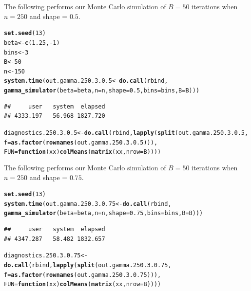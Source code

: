 \documentclass[11pt]{article}\usepackage[]{graphicx}\usepackage[]{color}
\makeatletter
\newcommand{\hlnum}[1]{\textcolor[rgb]{0.686,0.059,0.569}{#1}}%
\newcommand{\hlopt}[1]{\textcolor[rgb]{0,0,0}{#1}}%
\newcommand{\hlstd}[1]{\textcolor[rgb]{0.345,0.345,0.345}{#1}}%
\newcommand{\hlkwa}[1]{\textcolor[rgb]{0.161,0.373,0.58}{\textbf{#1}}}%
\newcommand{\hlkwb}[1]{\textcolor[rgb]{0.69,0.353,0.396}{#1}}%
\newcommand{\hlkwc}[1]{\textcolor[rgb]{0.333,0.667,0.333}{#1}}%
\newcommand{\hlkwd}[1]{\textcolor[rgb]{0.737,0.353,0.396}{\textbf{#1}}}%
\newenvironment{kframe}{%
 \def\at@end@of@kframe{}%
 \ifinner\ifhmode%
  \def\at@end@of@kframe{\end{minipage}}%
  \begin{minipage}{\columnwidth}%
 \fi\fi%
 \def\FrameCommand##1{\hskip\@totalleftmargin \hskip-\fboxsep
 \colorbox{shadecolor}{##1}\hskip-\fboxsep
     \hskip-\linewidth \hskip-\@totalleftmargin \hskip\columnwidth}%
 \MakeFramed {\advance\hsize-\width
   \@totalleftmargin\z@ \linewidth\hsize
   \@setminipage}}%
 {\par\unskip\endMakeFramed%
 \at@end@of@kframe}
\newenvironment{knitrout}{}{} %
\makeatother
\begin{document}
The following performs our Monte Carlo simulation of $B = 50$ iterations 
when $n = 250$ and shape = $0.5$.

\begin{knitrout}
\color{fgcolor}\begin{kframe}
\begin{alltt}
\hlkwd{set.seed}\hlstd{(}\hlnum{13}\hlstd{)}
\hlstd{beta} \hlkwb{<-} \hlkwd{c}\hlstd{(}\hlnum{1.25}\hlstd{,} \hlopt{-}\hlnum{1}\hlstd{)}
\hlstd{bins} \hlkwb{<-} \hlnum{3}
\hlstd{B} \hlkwb{<-} \hlnum{50}
\hlstd{n} \hlkwb{<-} \hlnum{150}
\hlkwd{system.time}\hlstd{(out.gamma.250.3.0.5} \hlkwb{<-} \hlkwd{do.call}\hlstd{(rbind,}
  \hlkwd{gamma_simulator}\hlstd{(}\hlkwc{beta} \hlstd{= beta,} \hlkwc{n} \hlstd{= n,} \hlkwc{shape} \hlstd{=} \hlnum{0.5}\hlstd{,} \hlkwc{bins} \hlstd{= bins,} \hlkwc{B} \hlstd{= B)))}
\end{alltt}
\begin{verbatim}
##     user   system  elapsed 
## 4333.197   56.968 1827.720
\end{verbatim}
\begin{alltt}
\hlstd{diagnostics.250.3.0.5} \hlkwb{<-} \hlkwd{do.call}\hlstd{(rbind,} \hlkwd{lapply}\hlstd{(}\hlkwd{split}\hlstd{(out.gamma.250.3.0.5,}
  \hlkwc{f} \hlstd{=} \hlkwd{as.factor}\hlstd{(}\hlkwd{rownames}\hlstd{(out.gamma.250.3.0.5))),}
  \hlkwc{FUN} \hlstd{=} \hlkwa{function}\hlstd{(}\hlkwc{xx}\hlstd{)} \hlkwd{colMeans}\hlstd{(}\hlkwd{matrix}\hlstd{(xx,} \hlkwc{nrow} \hlstd{= B))))}
\end{alltt}
\end{kframe}
\end{knitrout}


The following performs our Monte Carlo simulation of $B = 50$ iterations 
when $n = 250$ and shape = $0.75$.

\begin{knitrout}
\color{fgcolor}\begin{kframe}
\begin{alltt}
\hlkwd{set.seed}\hlstd{(}\hlnum{13}\hlstd{)}
\hlkwd{system.time}\hlstd{(out.gamma.250.3.0.75} \hlkwb{<-} \hlkwd{do.call}\hlstd{(rbind,}
  \hlkwd{gamma_simulator}\hlstd{(}\hlkwc{beta} \hlstd{= beta,} \hlkwc{n} \hlstd{= n,} \hlkwc{shape} \hlstd{=} \hlnum{0.75}\hlstd{,} \hlkwc{bins} \hlstd{= bins,} \hlkwc{B} \hlstd{= B)))}
\end{alltt}
\begin{verbatim}
##     user   system  elapsed 
## 4347.287   58.482 1832.657
\end{verbatim}
\begin{alltt}
\hlstd{diagnostics.250.3.0.75} \hlkwb{<-} \hlkwd{do.call}\hlstd{(rbind,} \hlkwd{lapply}\hlstd{(}\hlkwd{split}\hlstd{(out.gamma.250.3.0.75,}
  \hlkwc{f} \hlstd{=} \hlkwd{as.factor}\hlstd{(}\hlkwd{rownames}\hlstd{(out.gamma.250.3.0.75))),}
  \hlkwc{FUN} \hlstd{=} \hlkwa{function}\hlstd{(}\hlkwc{xx}\hlstd{)} \hlkwd{colMeans}\hlstd{(}\hlkwd{matrix}\hlstd{(xx,} \hlkwc{nrow} \hlstd{= B))))}
\end{alltt}
\end{kframe}
\end{knitrout}
\end{document}
